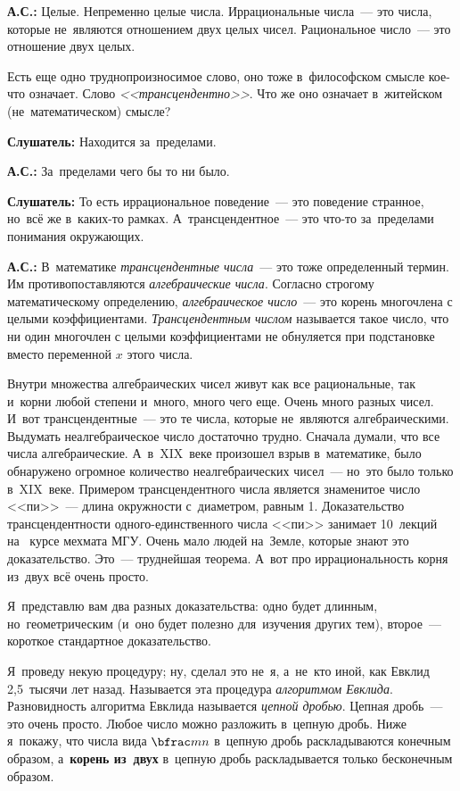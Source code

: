 \textbf{А.С.:} Целые. Непременно целые числа. Иррациональные числа~--- это числа, которые не~являются
отношением двух целых чисел. Рациональное число~--- это отношение двух целых.

Есть еще одно труднопроизносимое слово, оно тоже в~философском смысле кое-что означает. Слово
\textit{<<трансцендентно>>}. Что же оно означает в~житейском (не~математическом) смысле?

\textbf{Слушатель:} Находится за~пределами.

\textbf{А.С.:} За~пределами чего бы то ни было.

\textbf{Слушатель:} То есть иррациональное поведение~--- это поведение странное, но~всё же в~каких-то
рамках. А~трансцендентное~--- это что-то за~пределами понимания окружающих.

\textbf{А.С.:} В~математике \textit{трансцендентные числа}~--- это тоже определенный термин. Им
противопоставляются \textit{алгебраические числа}. Согласно строгому математическому определению,
\textit{алгебраическое число}~--- это корень многочлена с целыми коэффициентами. \textit{Трансцендентным числом}
называется такое число, что ни один многочлен с целыми коэффициентами не обнуляется при подстановке
вместо переменной $x$ этого числа.


Внутри множества алгебраических чисел живут как все рациональные, так и~корни любой степени
и~много, много чего еще. Очень много разных чисел. И~вот трансцендентные~--- это те числа, которые
не~являются алгебраическими. Выдумать неалгебраическое число достаточно трудно. Сначала думали, что
все числа алгебраические. А~в~XIX~веке произошел взрыв в~математике, было обнаружено огромное
количество неалгебраических чисел~--- но~это было только в~XIX~веке. Примером трансцендентного числа
является знаменитое число <<пи>>~--- длина окружности с~диаметром, равным 1. Доказательство
трансцендентности одного-единственного числа <<пи>> занимает 10~лекций на~ курсе мехмата МГУ.
Очень мало людей на~Земле, которые знают это доказательство. Это~--- труднейшая теорема.
А~вот про иррациональность корня из~двух всё очень просто.


Я~представлю вам два разных доказательства: одно будет длинным, но~геометрическим (и~оно будет
полезно для~изучения других тем), второе~--- короткое стандартное доказательство.

Я~проведу некую процедуру; ну, сделал это не~я, а~не~кто иной, как Евклид 2,5~тысячи лет назад.
Называется эта процедура \textit{алгоритмом Евклида}.
 Разновидность алгоритма Евклида называется \textit{цепной
дробью}. Цепная дробь~--- это очень просто. Любое число можно разложить в~цепную дробь. Ниже
я~покажу, что числа вида $\bfrac mn$ в~цепную дробь раскладываются конечным образом, а~\textbf{корень из~двух}
в~цепную дробь раскладывается только бесконечным образом.

